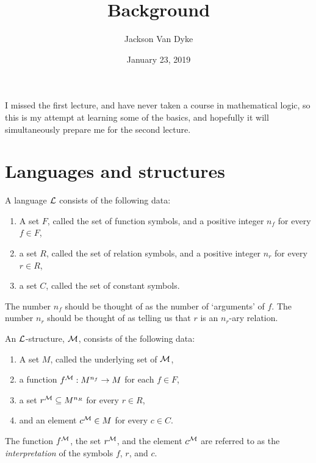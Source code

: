 \documentclass{amsart}
\begin{document}
\title{Background}
\author{Jackson Van Dyke}
\date{January 23, 2019}
\maketitle

I missed the first lecture, and have never taken a course in mathematical logic,
so this is my attempt at learning some of the basics, and 
hopefully it will simultaneously prepare me for the second lecture.

\section{Languages and structures}

\begin{defn}
A language $\mathcal{L}$ consists of the following data:
\begin{enumerate}
\item A set $F$, called the set of function symbols, and a positive integer $n_f$ for every
$f\in F$,
\item a set $R$, called the set of relation symbols, and a positive integer $n_r$ for every 
$r\in R$,
\item a set $C$, called the set of constant symbols.
\end{enumerate}
\end{defn}

\begin{rmk}
The number $n_f$ should be thought of as the number of `arguments' of $f$.
The number $n_r$ should be thought of as telling us that $r$ is an $n_r$-ary relation.
\end{rmk}

\begin{defn}
An $\mathcal{L}$-structure, $\mathcal{M}$, consists of the following data:
\begin{enumerate}
\item A set $M$, called the underlying set of $\mathcal{M}$,
\item a function $f^{\mathcal{M}} : M^{n_f} \rightarrow M$ for each $f\in F$,
\item a set $r^{\mathcal{M}} \subseteq M^{n_R}$ for every $r\in R$,
\item and an element $c^{\mathcal{M}} \in M$ for every $c\in C$.
\end{enumerate}
The function $f^{\mathcal{M}}$, 
the set $r^{\mathcal{M}}$, and the element $c^{\mathcal{M}}$ are referred to as the \emph{interpretation} of 
the symbols $f$, $r$, and $c$.
\end{defn}
\end{document}
